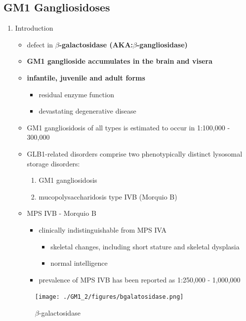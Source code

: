 \documentclass{scrartcl}
\begin{document}
\subsection{GM1 Gangliosidoses}
\label{sec:org4941444}
\begin{enumerate}
\item Introduction
\label{sec:orgd204ead}

\begin{itemize}
\item defect in \textbf{\(\beta\)-galactosidase (AKA:\(\beta\)-gangliosidase)}
\item \textbf{GM1 ganglioside accumulates in the brain and visera}
\item \textbf{infantile, juvenile and adult forms}
\begin{itemize}
\item residual enzyme function
\item devastating degenerative disease
\end{itemize}
\item GM1 gangliosidosis of all types is estimated to occur in 1:100,000 - 300,000

\item GLB1-related disorders comprise two phenotypically distinct lysosomal storage disorders:
\begin{enumerate}
\item GM1 gangliosidosis
\item mucopolysaccharidosis type IVB (Morquio B)
\end{enumerate}

\item MPS IVB - Morquio B
\begin{itemize}
\item clinically indistinguishable from MPS IVA 
\begin{itemize}
\item skeletal changes, including short stature and skeletal dysplasia
\item normal intelligence
\end{itemize}
\item prevalence of MPS IVB has been reported as 1:250,000 - 1,000,000
\end{itemize}
\end{itemize}

\begin{figure}[htbp]
\centering
\texttt{[image: ./GM1\_2/figures/bgalatosidase.png]}
\caption{\label{fig:org0a28349}
\(\beta\)-galactosidase}
\end{figure}



\end{enumerate}
\end{document}
